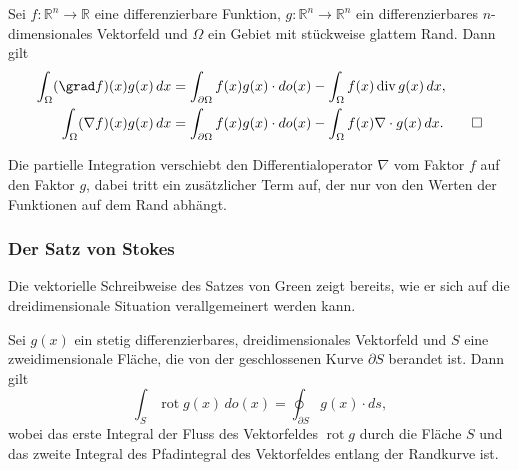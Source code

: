 \begin{satz}
Sei $f\colon\mathbb{R}^n\to\mathbb{R}$ eine differenzierbare Funktion,
$g\colon\mathbb{R}^n\to\mathbb{R}^n$ ein differenzierbares
$n$-dimensionales Vektorfeld und $\Omega$ ein Gebiet mit stückweise
glattem Rand.
Dann gilt
\begin{align*}
\int_{\Omega} (\grad f)(x) g(x)\,dx
&=
\int_{\partial\Omega} f(x)g(x)\cdot do(x)
-
\int_{\Omega} f(x)\operatorname{div}g(x)\,dx,
\\
\int_{\Omega} (\nabla f)(x)g(x)\,dx
&=
\int_{\partial\Omega} f(x)g(x)\cdot do(x)
-
\int_{\Omega} f(x)\nabla\cdot g(x)\,dx.
\qedhere
\end{align*}
\end{satz}

Die partielle Integration verschiebt den Differentialoperator $\nabla$
vom Faktor $f$ auf den Faktor $g$, dabei tritt ein zusätzlicher Term
auf, der nur von den Werten der Funktionen auf dem Rand abhängt.


%
%
\subsubsection{Der Satz von Stokes}
Die vektorielle Schreibweise des Satzes von Green zeigt bereits,
wie er sich auf die dreidimensionale Situation verallgemeinert werden kann.

\begin{satz}[Stokes]
\label{buch:felder:fundamentallemma:satz:stokes}
%
%
Sei $g(x)$ ein stetig differenzierbares, dreidimensionales Vektorfeld
und $S$ eine zweidimensionale Fläche, die von der geschlossenen
Kurve $\partial S$ berandet ist.
Dann gilt
\begin{equation}
\int_S \operatorname{rot} g(x)\,do(x)
=
\oint_{\partial S} g(x)\cdot ds,
\label{buch:felder:fundamentallemma:eqn:stokes}
\end{equation}
wobei das erste Integral der Fluss des Vektorfeldes $\operatorname{rot}g$
durch die Fläche $S$ und das zweite Integral des Pfadintegral des
Vektorfeldes entlang der Randkurve ist.
\end{satz}

